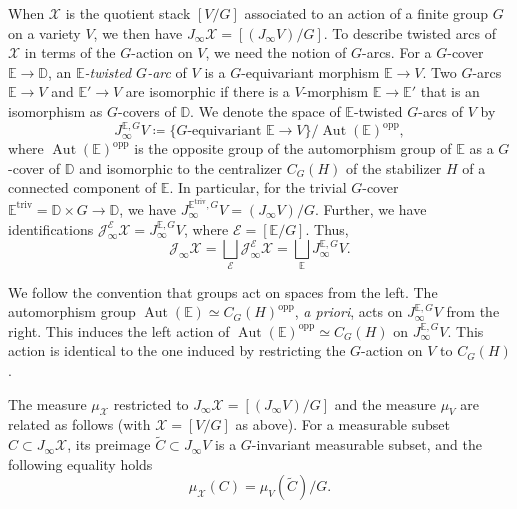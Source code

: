 \documentclass[12pt]{amsart}
\theoremstyle{plain}   %
\theoremstyle{definition}    %
\theoremstyle{remark}    %
\numberwithin{equation}{theorem}
\DeclareMathOperator{\Aut}{{Aut}}
\newcommand{\sE}{\mathcal{E}}
\newcommand{\sJ}{\mathcal{J}}
\newcommand{\sX}{\mathcal{X}}
\newcommand{\bD}{\mathbb{D}}
\newcommand{\bE}{\mathbb{E}}
\begin{document}
When $\sX$ is the quotient stack $[V/G]$ associated to an action of a finite group $G$ on a variety $V$, we then have $J_{\infty} \sX =[(J_{\infty}V)/G]$. 
To describe twisted arcs of $\sX$ in terms of the $G$-action on $V$, we need the notion of $G$-arcs. For a $G$-cover $\bE\to \bD$, an \emph{$\bE$-twisted $G$-arc} of $V$ is a $G$-equivariant morphism $\bE\to V$. Two $G$-arcs $\bE\to V$ and $\bE'\to V$ are isomorphic if there is a $V$-morphism $\bE\to \bE'$ that is an isomorphism as $G$-covers of $\bD$. We denote the space of $\bE$-twisted $G$-arcs of $V$ by 
\[
J_{\infty}^{\bE,G}V \coloneqq \{G\text{-equivariant }\bE\to V\}/ \Aut(\bE)^{\mathrm{opp}},
\]
where $\Aut(\bE)^{\mathrm{opp}}$ is the opposite group of the automorphism group of $\bE$ as a $G$-cover of $\bD$
and isomorphic to the centralizer $C_G(H)$ of the stabilizer $H$ of a connected component of $\bE$. 
In particular, for the trivial $G$-cover $\bE^{\mathrm{triv}}=\bD \times G \to \bD $, we have
$J_{\infty}^{\bE ^{\mathrm{triv}},G}V = (J_\infty V)/G$. Further, we have identifications $\sJ_{\infty}^\sE\sX = J_{\infty}^{\bE,G}V$, where $\sE=[\bE/G]$. Thus,
\[
\sJ_{\infty} \sX =\bigsqcup _{\sE} \sJ^\sE_\infty \sX= \bigsqcup _{\bE} J_\infty ^{\bE,G}V .
\]

\begin{remark}
We follow the convention that groups act on spaces from the left. The automorphism group $\Aut(\bE)\simeq C_G(H)^{\mathrm{opp}}$, \emph{a priori}, acts on $J_{\infty}^{\bE,G}V$ from the right. This induces the left action of $\Aut(\bE)^{\mathrm{opp}} \simeq C_G(H)$ on $J_{\infty}^{\bE,G}V$. This action is identical to the one induced by restricting the $G$-action on $V$ to $C_G(H)$.
\end{remark}


The measure $\mu_{\sX}$ restricted to $J_{\infty} \sX = [(J_\infty V)/G]$ and the measure $\mu_V$ are related as follows (with $\sX=[V/G]$ as above). For a measurable subset $C\subset J_\infty \sX$, its preimage $\tilde{C}\subset J_{\infty} V$ is a $G$-invariant measurable subset, and the following equality holds
\begin{equation} \label{eqn.MeasureOfQuotient}
\mu_\sX(C)=\mu_V(\tilde{C})/G.
\end{equation}
\end{document}
